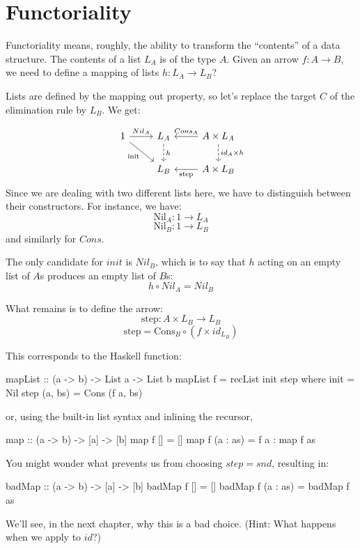 \documentclass[DaoFP]{subfiles}
\begin{document}
\section{Functoriality}

Functoriality means, roughly, the ability to transform the ``contents'' of a data structure. The contents of a list $L_A$ is of the type $A$. Given an arrow $f \colon A \to B$, we need to define a mapping of lists $h \colon L_A \to L_B$?

Lists are defined by the mapping out property, so let's replace the target $C$ of the elimination rule by $L_B$. We get:

\[
 \begin{tikzcd}
 1
 \arrow[r, "Nil_A"]
 \arrow[rd, "\text{init}"']
 &L_A
\arrow[d, dashed, "h"]
&A \times L_A
  \arrow[l, "Cons_A"']
\arrow[d, dashed, "id_A \times h"]
\\
& L_B
& A \times L_B
\arrow[l, "\text{step}"]
  \end{tikzcd}
\]
Since we are dealing with two different lists here, we have to distinguish between their constructors. For instance, we have: 
\[\text{Nil}_A \colon 1 \to L_A \]
\[\text{Nil}_B \colon 1 \to L_B \]
and similarly for $Cons$.

The only candidate for $init$ is $Nil_B$, which is to say that $h$ acting on an empty list of $A$s produces an empty list of $B$s:
\[ h \circ Nil_A = Nil_B \]

What remains is to define the arrow:
\[\text{step} \colon A \times L_B \to L_B\]
\[ \text{step} = \text{Cons}_B \circ (f \times id_{L_B}) \]

This corresponds to the Haskell function:

\begin{haskell}
mapList :: (a -> b) -> List a -> List b
mapList f = recList init step
  where
    init = Nil
    step (a, bs) = Cons (f a, bs)
\end{haskell}
or, using the built-in list syntax and inlining the recursor,
\begin{haskell}
map :: (a -> b) -> [a] -> [b]
map f [] = []
map f (a : as) = f a : map f as
\end{haskell}

You might wonder what prevents us from choosing $step = snd$, resulting in:
\begin{haskell}
badMap :: (a -> b) -> [a] -> [b]
badMap f [] = []
badMap f (a : as) = badMap f as
\end{haskell}
We'll see, in the next chapter, why this is a bad choice. (Hint: What happens when we apply  to $id$?)
\end{document}

